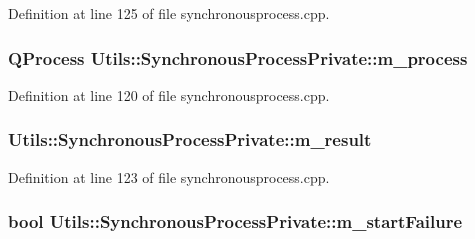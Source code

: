 Definition at line 125 of file synchronousprocess.\-cpp.

\hypertarget{struct_utils_1_1_synchronous_process_private_a9d038c134196fac6a5f996a3d290ef3a}{
\subsubsection[{m\-\_\-process}]{\setlength{\rightskip}{0pt plus 5cm}Q\-Process Utils\-::\-Synchronous\-Process\-Private\-::m\-\_\-process}}\label{struct_utils_1_1_synchronous_process_private_a9d038c134196fac6a5f996a3d290ef3a}


Definition at line 120 of file synchronousprocess.\-cpp.

\hypertarget{struct_utils_1_1_synchronous_process_private_a608f84c5b1a6612ba627ddbe33fe5a0a}{
\subsubsection[{m\-\_\-result}]{ Utils\-::\-Synchronous\-Process\-Private\-::m\-\_\-result}}\label{struct_utils_1_1_synchronous_process_private_a608f84c5b1a6612ba627ddbe33fe5a0a}


Definition at line 123 of file synchronousprocess.\-cpp.

\hypertarget{struct_utils_1_1_synchronous_process_private_af0eb23e013827b48bea15ed1ba1365c0}{
\subsubsection[{m\-\_\-start\-Failure}]{\setlength{\rightskip}{0pt plus 5cm}bool Utils\-::\-Synchronous\-Process\-Private\-::m\-\_\-start\-Failure}}\label{struct_utils_1_1_synchronous_process_private_af0eb23e013827b48bea15ed1ba1365c0}


